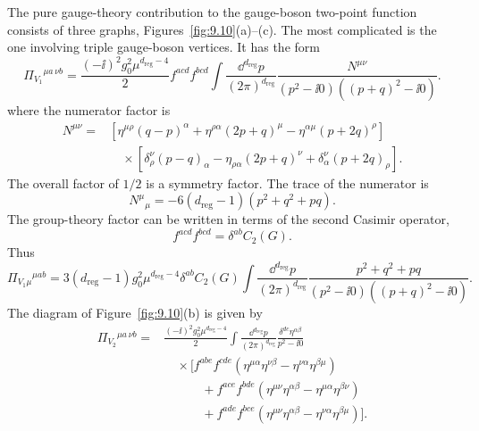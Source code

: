 The pure gauge-theory contribution to the gauge-boson two-point function
consists of three graphs, Figures~\ref{fig:9.10}(a)--(c). The most complicated
is the one involving triple gauge-boson vertices. It has the form
\begin{equation}
  \Pi_{V_1}{}^{\mu a\,\nu b}
  =\frac{(-\ii)^2g_0^2\mu^{d_{\mathrm{reg}}-4}}{2}f^{acd}f^{bcd}
  \int\frac{\dd^{d_{\mathrm{reg}}}p}{(2\pi)^{d_{\mathrm{reg}}}}
  \frac{N^{\mu\nu}}{(p^2-\ii0)((p+q)^2-\ii0)}.
\label{eq:9.8}
\end{equation}
where the numerator factor is
\[
\begin{aligned}
N^{\mu\nu}={}&\left[\eta^{\mu\rho}(q-p)^\alpha
 +\eta^{\rho\alpha}(2p+q)^\mu-\eta^{\alpha\mu}(p+2q)^\rho\right]\\
&\quad\times\left[\delta_\rho^\nu(p-q)_\alpha
 -\eta_{\rho\alpha}(2p+q)^\nu+\delta_\alpha^\nu(p+2q)_\rho\right].
\end{aligned}
\]
The overall factor of $1/2$ is a symmetry factor. The trace of the numerator is
\[
  N^\mu{}_{\mu}=-6(d_{\mathrm{reg}}-1)(p^2+q^2+pq).
\]
The group-theory factor can be written in terms of the second Casimir operator,
\[
  f^{acd}f^{bcd}=\delta^{ab}C_2(G).
\]
Thus
\begin{equation}
  \Pi_{V_1\mu}{}^{\mu ab}
  =3(d_{\mathrm{reg}}-1)g_0^2\mu^{d_{\mathrm{reg}}-4}\delta^{ab}C_2(G)
  \int\frac{\dd^{d_{\mathrm{reg}}}p}{(2\pi)^{d_{\mathrm{reg}}}}
  \frac{p^2+q^2+pq}{(p^2-\ii0)((p+q)^2-\ii0)}.
\label{eq:9.9}
\end{equation}
The diagram of Figure~\ref{fig:9.10}(b) is given by
\begin{equation}
\begin{aligned}
  \Pi_{V_2}{}^{\mu a\,\nu b}={}&
  \frac{(-\ii)^2g_0^2\mu^{d_{\mathrm{reg}}-4}}{2}
  \int\frac{\dd^{d_{\mathrm{reg}}}p}{(2\pi)^{d_{\mathrm{reg}}}}
  \frac{\delta^{dc}\eta^{\alpha\beta}}{p^2-\ii0}\\
  &\quad\times\big[ f^{abe}f^{cde}
  (\eta^{\mu\alpha}\eta^{\nu\beta}-\eta^{\nu\alpha}\eta^{\beta\mu})\\
  &\qquad\quad+f^{ace}f^{bde}
  (\eta^{\mu\nu}\eta^{\alpha\beta}-\eta^{\mu\alpha}\eta^{\beta\nu})\\
  &\qquad\quad+f^{ade}f^{bce}
  (\eta^{\mu\nu}\eta^{\alpha\beta}-\eta^{\nu\alpha}\eta^{\beta\mu})\big].
\end{aligned}
\label{eq:9.10}
\end{equation}
